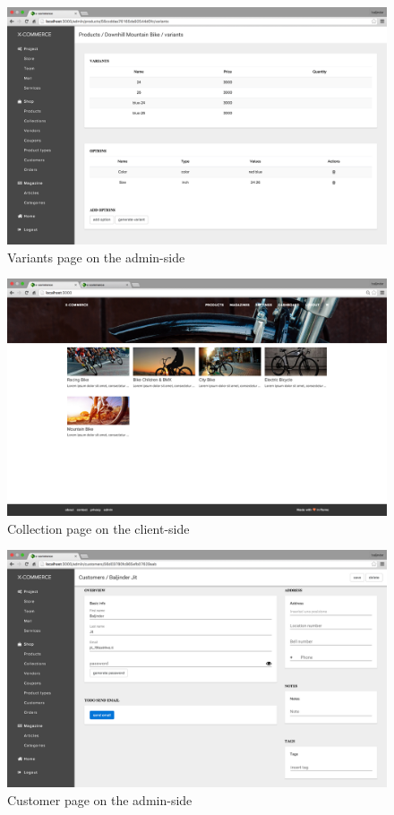 \newpage
\begin{figure}[htb]
\centering
\includegraphics[width=0.84\linewidth]{images/chapter4/page-variants.png}\hfill
\caption[Variants page on the admin-side]{Variants page on the admin-side}
\label{fig:page_variants_admin}
\end{figure}
\begin{figure}[htb]
\centering
\includegraphics[width=0.84\linewidth]{images/chapter4/page-collection.png}\hfill
\caption[Collection page on the client-side]{Collection page on the client-side}
\label{fig:page_collection_cli}
\end{figure}
\newpage
\begin{figure}[htb]
\centering
\includegraphics[width=0.84\linewidth]{images/chapter4/page-customer.png}\hfill
\caption[Customer page on the admin-side]{Customer page on the admin-side}
\label{fig:page_customer_admin}
\end{figure}
